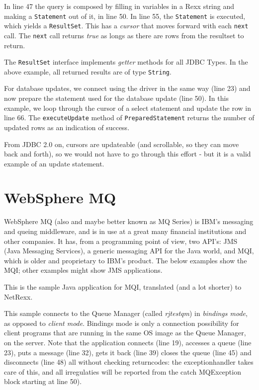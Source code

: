 In line 47 the query is composed by filling in variables in a Rexx
string and making a \texttt{Statement} out of it, in line 50. In line
  55, the \texttt{Statement} is executed, which yields a
  \texttt{ResultSet}. This has a \emph{cursor} that moves forward with
  each \texttt{next} call. The \texttt{next} call returns \emph{true}
  as longs as there are rows from the resultset to return.

The \texttt{ResultSet} interface implements \emph{getter} methods for
  all JDBC Types. In the above example, all returned results are of
  type \texttt{String}.

 
For database updates, we connect using the driver in the same way
(line 23) and now prepare the statement used for the database update
(line 50). In this example, we loop through the cursor of a select
statement and update the row in line 66. The \texttt{executeUpdate}
method of \texttt{PreparedStatement} returns the number of updated
rows as an indication of success.

From JDBC 2.0 on, cursors are updateable (and scrollable, so they can
move back and forth), so we would not have to go
through this effort - but it is a valid example of an update statement.
\chapter{WebSphere MQ}
WebSphere MQ (also and maybe better known as MQ Series) is IBM's
messaging and queing middleware, and is in use at a great many financial
institutions and other companies. It has, from a programming point of
view, two API's: JMS (Java Messaging Services), a generic messaging
API for the Java world, and MQI, which is older and proprietary to
IBM's product. The below examples show the MQI; other examples might
show JMS applications.

This is the sample Java application for MQI, translated (and a lot
shorter) to NetRexx.

This sample connects to the Queue Manager (called \emph{rjtestqm}) in
\emph{bindings mode}, as opposed to \emph{client mode}. Bindings mode
is only a connection possibility for client programs that are running
in the same OS image as the Queue Manager, on the server. Note that
the application connects (line 19), accesses a queue (line 23), puts a
message (line 32), gets it back (line 39) closes the queue (line 45) and disconnects (line 48) all without checking
returncodes: the exceptionhandler takes care of this, and all
irregulaties will be reported from the catch MQException block
starting at line 50).

